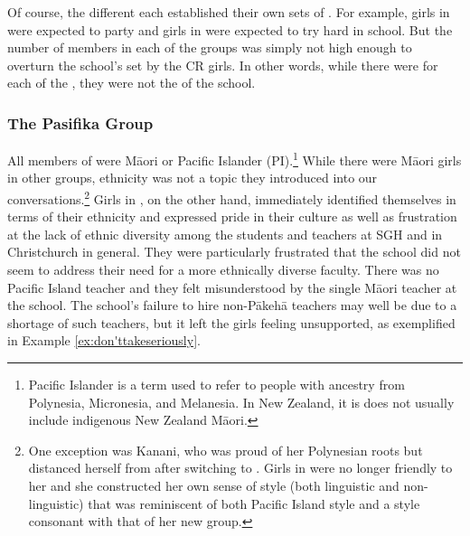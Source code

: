 Of course, the different  each established their own sets of . For example, girls in  were expected to party and girls in  were expected to try hard in school. But the number of members in each of the groups was simply not high enough to overturn the school's  set by the CR girls. In other words, while there were  for each of the , they were not the  of the school.

\subsubsection{The Pasifika Group}

All members of  were M\=aori or Pacific Islander (PI).\footnote{Pacific Islander is a term used to refer to people with ancestry from Polynesia, Micronesia, and Melanesia. In New Zealand, it is does not usually include indigenous New Zealand M\=aori.} While there were M\=aori girls in other groups, ethnicity was not a topic they introduced into our conversations.\footnote{One exception was Kanani, who was proud of her Polynesian roots but distanced herself from  after switching to . Girls in  were no longer friendly to her and she constructed her own sense of style (both linguistic and non-linguistic) that was reminiscent of both Pacific Island style and a style consonant with that of her new group.}  Girls in , on the other hand, immediately identified themselves in terms of their ethnicity and expressed pride in their culture as well as frustration at the lack of ethnic diversity among the students and teachers at SGH and in Christchurch in general. They were particularly frustrated that the school did not seem to address their need for a more ethnically diverse faculty. There was no Pacific Island teacher and they felt misunderstood by the single M\=aori teacher at the school.  The school's failure to hire non-P\=akeh\=a teachers may well be due to a shortage of such teachers, but it left the girls feeling unsupported, as exemplified in Example \ref{ex:don'ttakeseriously}.
  
			


